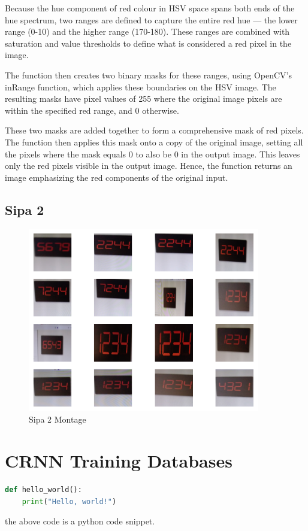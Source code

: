 Because the hue component of red colour in HSV space spans both ends of the hue spectrum, two ranges are defined to capture the entire red hue — the lower range (0-10) and the higher range (170-180). These ranges are combined with saturation and value thresholds to define what is considered a red pixel in the image.

The function then creates two binary masks for these ranges, using OpenCV's inRange function, which applies these boundaries on the HSV image. The resulting masks have pixel values of 255 where the original image pixels are within the specified red range, and 0 otherwise.

These two masks are added together to form a comprehensive mask of red pixels. The function then applies this mask onto a copy of the original image, setting all the pixels where the mask equals 0 to also be 0 in the output image. This leaves only the red pixels visible in the output image. Hence, the function returns an image emphasizing the red components of the original input.


\newpage

\subsection{Sipa 2}

\begin{figure}[ht]
    \centering
    \includegraphics[width=0.9\textwidth]{Figures/EDA_Charts/2/montage.png}
    \caption[Sipa 2 Montage]{Sipa 2 Montage}
    \label{fig:Sipa 2 Montage}
\end{figure}


\section{CRNN Training Databases}


\newpage

\begin{lstlisting}[language=Python, caption=Python example]
    def hello_world():
    print("Hello, world!")
\end{lstlisting}


the above code is a python code snippet.


